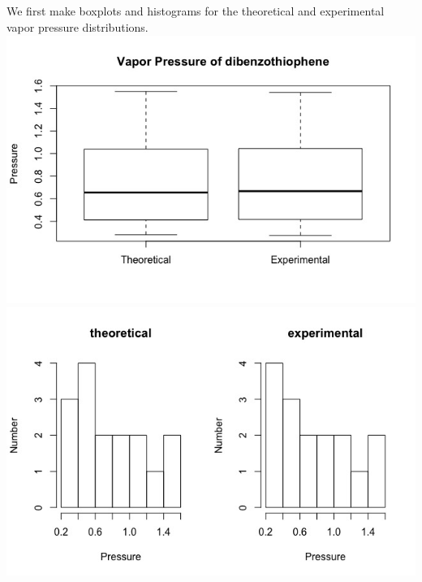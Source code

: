 \documentclass[12pt,letterpaper,titlepage,en-US]{article}
\begin{document}
\subsection{}
We first make boxplots and histograms for the theoretical and experimental vapor pressure distributions.\\
\includegraphics[scale=0.6]{boxplot3.jpeg}\\




\includegraphics[scale=0.6]{hist3.jpeg}\\
\end{document}
